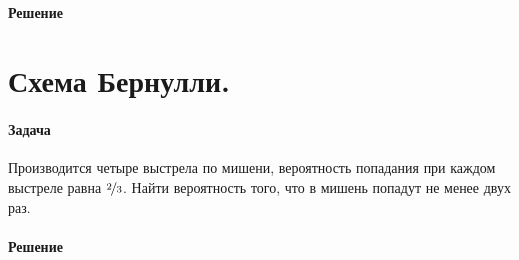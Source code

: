 \documentclass{article}
\begin{document}
\paragraph{Решение}
  
\section{Схема Бернулли.}
\paragraph{Задача}
Производится четыре выстрела по мишени, вероятность попадания при каждом выстреле равна \(\nicefrac{2}{3}\). Найти вероятность того, что в мишень попадут не менее двух раз.
\paragraph{Решение}
\end{document}
